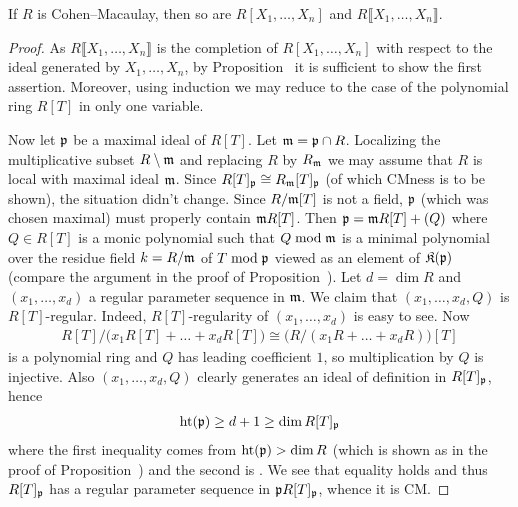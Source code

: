 \documentclass[a4paper,parskip=half,numbers=enddot, DIV=12]{scrreprt}
\begin{document}
\begin{prop}
	If $R$ is Cohen--Macaulay, then so are $R[X_1,\ldots,X_n]$ and $R\llbracket X_1,\ldots,X_n\rrbracket$.
\end{prop}
\begin{proof}
	As $R\llbracket X_1,\ldots,X_n\rrbracket$ is the completion of $R[X_1,\ldots,X_n]$ with respect to the ideal generated by $X_1,\ldots,X_n$, by Proposition~ it is sufficient to show the first assertion. Moreover, using induction we may reduce to the case of the polynomial ring $R[T]$ in only one variable. 
	
	Now let $\mathfrak{p}$ be a maximal ideal of $R[T]$. Let $\mathfrak{m}=\mathfrak{p}\cap R$. Localizing the multiplicative subset $R\setminus \mathfrak{m}$ and replacing $R$ by $R_{\mathfrak{m}}$ we may assume that $R$ is local with maximal ideal $\mathfrak{m}$. Since $R[T]_{\mathfrak{p}}\cong R_{\mathfrak{m}}[T]_{\mathfrak{p}}$ (of which CMness is to be shown), the situation didn't change. Since $R/\mathfrak{m}[T]$ is not a field, $\mathfrak{p}$ (which was chosen maximal) must properly contain $\mathfrak{m} R[T]$. Then $\mathfrak{p}=\mathfrak{m} R[T]+(Q)$ where $Q\in R[T]$ is a monic polynomial such that $Q\bmod \mathfrak{m}$ is a minimal polynomial over the residue field $k=R/\mathfrak{m}$ of $T\bmod \mathfrak{p}$ viewed as an element of $\mathfrak{K}(\mathfrak{p})$ (compare the argument in the proof of Proposition~). Let $d=\dim R$ and $(x_1,\ldots,x_d)$ a regular parameter sequence in $\mathfrak{m}$. We claim that $(x_1,\ldots,x_d,Q)$ is $R[T]$-regular. Indeed, $R[T]$-regularity of $(x_1,\ldots,x_d)$ is easy to see. Now
	\begin{align*}
		R[T]/\big(x_1R[T]+\ldots+x_dR[T]\big)\cong\big(R/(x_1R+\ldots+x_dR)\big)[T]
	\end{align*}
	is a polynomial ring and $Q$ has leading coefficient $1$, so multiplication by $Q$ is injective. Also $(x_1,\ldots,x_d,Q)$ clearly generates an ideal of definition in $R[T]_{\mathfrak{p}}$, hence
	\begin{align*}
		\operatorname{ht}(\mathfrak{p})\geq d+1\geq \dim R[T]_{\mathfrak{p}}
	\end{align*}
	where the first inequality comes from $\operatorname{ht}(\mathfrak{p})> \dim R$ (which is shown as in the proof of Proposition~) and the second is \cite[Theorem~12]{alg2}. We see that equality holds and thus $R[T]_{\mathfrak{p}}$ has a regular parameter sequence in $\mathfrak{p} R[T]_{\mathfrak{p}}$, whence it is CM.
\end{proof}
\end{document}

